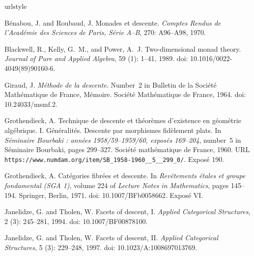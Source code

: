 \documentclass[11pt,a4paper]{article}
\numberwithin{equation}{section}
\theoremstyle{definition}
\theoremstyle{remark}
\begin{document}
\begin{thebibliography}{15}
\providecommand{\natexlab}[1]{#1}
\providecommand{\url}[1]{\texttt{#1}}
\expandafter\ifx\csname urlstyle\endcsname\relax
  \providecommand{\doi}[1]{doi: #1}\else
  \providecommand{\doi}{doi: \begingroup \urlstyle{rm}\Url}\fi

B{\'e}nabou, J. and Roubaud, J.
\newblock Monades et descente.
\newblock \emph{Comptes Rendus de l'Acad{\'e}mie des Sciences de Paris,
  S{\'e}rie A--B}, 270: A96--A98, 1970.

Blackwell, R., Kelly, G.~M., and Power, A.~J.
\newblock Two-dimensional monad theory.
\newblock \emph{Journal of Pure and Applied Algebra}, 59 (1):
  1--41, 1989.
\newblock \doi{10.1016/0022-4049(89)90160-6}.

Giraud, J.
\newblock \emph{M{\'e}thode de la descente}.
\newblock Number~2 in Bulletin de la Soci{\'e}t{\'e} Math{\'e}matique de
  France, M{\'e}moire. Soci{\'e}t{\'e} Math{\'e}matique de France, 1964.
\newblock \doi{10.24033/msmf.2}.

Grothendieck, A.
\newblock Technique de descente et th{\'e}or{\`e}mes d'existence en
  g{\'e}om{\'e}trie alg{\'e}brique. {I.} {G{\'e}n{\'e}ralit{\'e}s.} {Descente}
  par morphismes fid{\`e}lement plats.
\newblock In \emph{S{\'e}minaire Bourbaki : ann{\'e}es 1958/59--1959/60,
  expos{\'e}s 169--204}, number~5 in S{\'e}minaire Bourbaki, pages 299--327.
  Soci{\'e}t{\'e} math{\'e}matique de France, 1960.
\newblock URL \url{https://www.numdam.org/item/SB_1958-1960__5__299_0/}.
\newblock Expos{\'e} 190.

Grothendieck, A.
\newblock Cat{\'e}gories fibr{\'e}es et descente.
\newblock In \emph{Rev{\^e}tements {\'e}tales et groupe fondamental ({SGA} 1)},
  volume 224 of \emph{Lecture Notes in Mathematics}, pages 145--194. Springer,
  Berlin, 1971.
\newblock \doi{10.1007/BFb0058662}.
\newblock Expos{\'e} VI.

Janelidze, G. and Tholen, W.
\newblock Facets of descent, {I}.
\newblock \emph{Applied Categorical Structures}, 2 (3):
  245--281, 1994.
\newblock \doi{10.1007/BF00878100}.

Janelidze, G. and Tholen, W.
\newblock Facets of descent, {II}.
\newblock \emph{Applied Categorical Structures}, 5 (3):
  229--248, 1997.
\newblock \doi{10.1023/A:1008697013769}.


\end{thebibliography}
\end{document}
